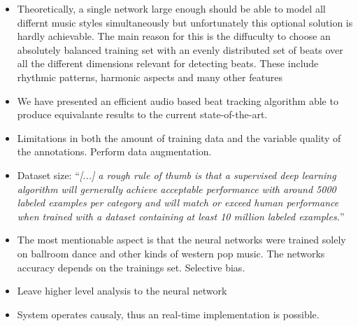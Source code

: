 \documentclass{scrartcl}
\begin{document}
\begin{itemize}
\item Theoretically, a single network large enough should be able to model all differnt music styles simultaneously but unfortunately this optional solution is hardly achievable. The main reason for this is the diffuculty to choose an absolutely balanced training set with an evenly distributed set of beats over all the different dimensions relevant for detecting beats. These include rhythmic patterns, harmonic aspects and many other features
\item We have presented an efficient audio based beat tracking algorithm able to produce equivalante results to the current state-of-the-art. 
\item Limitations in both the amount of training data and the variable quality of the annotations. Perform data augmentation. 
\item Dataset size: ``\emph{[...] a rough rule of thumb is that a supervised deep learning algorithm will gernerally achieve acceptable performance with around 5000 labeled examples per category and will match or exceed human performance when trained with a dataset containing at least 10 million labeled examples.}'' \cite[Goodfellow2016]{Goodfellow2016}
\item The most mentionable aspect is that the neural networks were trained solely on ballroom dance and other kinds of western pop music. The networks accuracy depends on the trainings set. Selective bias. 
\item Leave higher level analysis to the neural network
\item System operates causaly, thus an real-time implementation is possible.
\end{itemize}

\newpage
\end{document}
